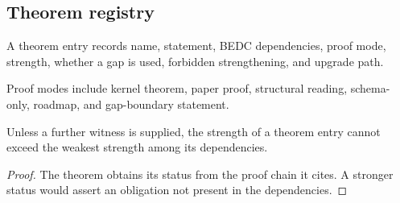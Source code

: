 \subsection{Theorem registry}
\label{subsec:philosophy-theorem-registry-table}

\begin{definition}
\label{def:philosophy-theorem-registry-entry}
A theorem entry records name, statement, BEDC dependencies, proof mode,
strength, whether a gap is used, forbidden strengthening, and upgrade
path.
\end{definition}

\begin{definition}
\label{def:philosophy-proof-mode-registry}
Proof modes include kernel theorem, paper proof, structural reading,
schema-only, roadmap, and gap-boundary statement.
\end{definition}

\begin{theorem}
\label{thm:philosophy-theorem-strength-bounded}
Unless a further witness is supplied, the strength of a theorem entry
cannot exceed the weakest strength among its dependencies.
\end{theorem}
\begin{proof}
The theorem obtains its status from the proof chain it cites. A
stronger status would assert an obligation not present in the
dependencies.
\end{proof}

